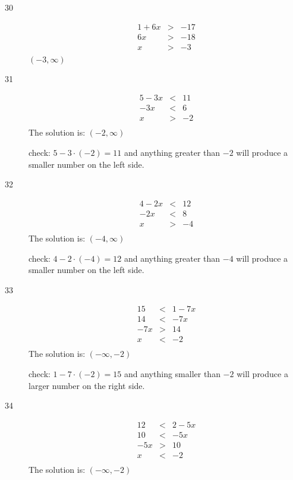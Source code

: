 \documentclass[letterpaper]{exam}
\begin{document}
    \begin{description}

      \item[30]
      \begin{align*}
        1 + 6x & > & -17 \\
        6x     & > & -18 \\
        x      & > & -3 \\
      \end{align*}
      $\boxed{ (-3, \infty) }$

      \item[31]
        \begin{align*}
          5 - 3x & < & 11 \\
          -3x    & < & 6 \\
          x      & > & -2 \\
        \end{align*}
      The solution is: \( (-2, \infty) \)

      check: \( 5 - 3 \cdot (-2) = 11\) and anything greater than $-2$ will produce a smaller number on the left side.

      \item[32]
      \begin{align*}
        4 - 2x &<& 12 \\
        -2x &<& 8 \\
        x &>& -4 \\
      \end{align*}
      The solution is: \( (-4, \infty) \)

      check: \( 4 - 2 \cdot (-4) = 12\) and anything greater than $-4$ will produce a smaller number on the left side.

      \item[33]
      \begin{align*}
        15 &<& 1 - 7x \\
        14 &<& -7x \\
        -7x &>& 14 \\
        x &<& -2 \\
      \end{align*}
      The solution is: \( (-\infty, -2) \)

      check: \( 1 - 7 \cdot (-2) = 15\) and anything smaller than $-2$ will produce a larger number on the right side.

      \item[34]
      \begin{align*}
        12 &<& 2 - 5x \\
        10 &<& -5x \\
        -5x &>& 10 \\
        x &<& -2 \\
      \end{align*}
      The solution is: \( (-\infty, -2) \)


\end{description}
\end{document}
